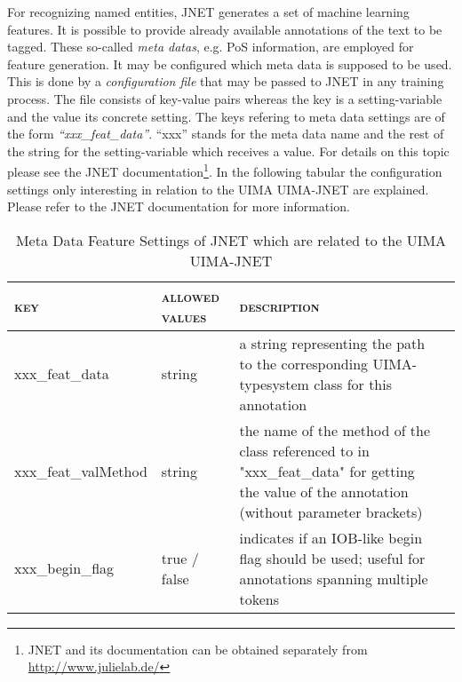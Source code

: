 \documentclass[11pt,a4paper,halfparskip]{scrartcl}
\begin{document}
For recognizing named entities, JNET generates a set of machine
learning features. It is possible to provide already available
annotations of the text to be tagged. These so-called \textit{meta
  datas}, e.g. PoS information, are employed for feature
generation. It may be configured which meta data is supposed to be
used. This is done by a \textit{configuration file} that may be passed
to JNET in any training process. The file consists of key-value pairs
whereas the key is a setting-variable and the value its concrete
setting. The keys refering to meta data settings are of the form
\textit{``xxx\_feat\_data''}. ``xxx'' stands for the meta data name
and the rest of the string for the setting-variable which receives a
value. For details on this topic please see the JNET
documentation\footnote{JNET and its documentation can be obtained
  separately from \url{http://www.julielab.de/}}. In the following
tabular the configuration settings only interesting in relation to the
UIMA UIMA-JNET are explained. Please refer to the JNET documentation
for more information.

\begin{table}[h!]
\begin{tabular}{|l|l|p{6cm}|l|}
\hline
\textsc{key} & \textsc{allowed values} & \textsc{description}\\
\hline\hline

xxx\_feat\_data & string &  a string representing the path to the corresponding
UIMA-typesystem class for this annotation\\

\hline

xxx\_feat\_valMethod & string & the name of the method of the class referenced
to in "xxx\_feat\_data" for getting the value of the annotation (without
parameter brackets)\\

\hline

xxx\_begin\_flag & true / false & indicates if an IOB-like begin flag should be
used; useful for annotations spanning multiple tokens\\
\hline

\end{tabular}
\caption{Meta Data Feature Settings of JNET which are related to the UIMA
UIMA-JNET}
\end{table}
\end{document}
